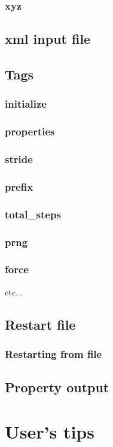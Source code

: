 \documentclass[12pt,fleqn]{report}
\begin{document}
\subsection{xyz}
\section{xml input file}
\section{Tags}
\subsection{initialize}
\subsection{properties}
\subsection{stride}
\subsection{prefix}
\subsection{total\_steps}
\subsection{prng}
\subsection{force}
etc...
\section{Restart file}
\subsection{Restarting from file}
\section{Property output}

\chapter{User's tips}
\end{document}
